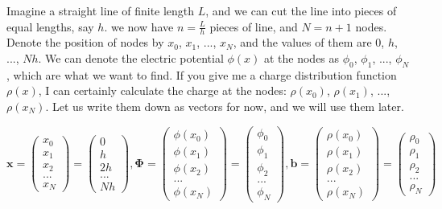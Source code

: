 \documentclass[paper=a4,fontsize=11pt]{scrartcl} %
\begin{document}
Imagine a straight line of finite length $L$, and we can cut the line into pieces of equal lengths, say $h$. we now have $n=\frac{L}{h}$ pieces of line, and $N=n+1$ nodes. Denote the position of nodes by $x_0$, $x_1$, ..., $x_N$, and the values of them are $0$, $h$, ..., $Nh$. We can denote the electric potential $\phi(x)$ at the nodes as $\phi_0$, $\phi_1$, ..., $\phi_N$, which are what we want to find. If you give me a charge distribution function $\rho(x)$, I can certainly calculate the charge at the nodes: $\rho(x_0)$, $\rho(x_1)$, ..., $\rho(x_N)$. Let us write them down as vectors for now, and we will use them later.

\begin{equation}\label{vectors}
\mathbf{x}=
    \begin{pmatrix}
    x_0 \\
    x_1 \\
    x_2 \\
    ... \\
    x_N
    \end{pmatrix}=
    \begin{pmatrix}
    0 \\
    h \\
    2h \\
    ... \\
    Nh
    \end{pmatrix},
    \mathbf{\Phi}=
    \begin{pmatrix}
    \phi(x_0) \\
    \phi(x_1) \\
    \phi(x_2) \\
    ... \\
    \phi(x_N)
    \end{pmatrix}=
    \begin{pmatrix}
    \phi_0 \\
    \phi_1 \\
    \phi_2 \\
    ... \\
    \phi_N
    \end{pmatrix},
    \mathbf{b}=
    \begin{pmatrix}
    \rho(x_0) \\
    \rho(x_1) \\
    \rho(x_2) \\
    ... \\
    \rho(x_N)
    \end{pmatrix}=
    \begin{pmatrix}
    \rho_0 \\
    \rho_1 \\
    \rho_2 \\
    ... \\
    \rho_N
    \end{pmatrix}
\end{equation}
\end{document}
